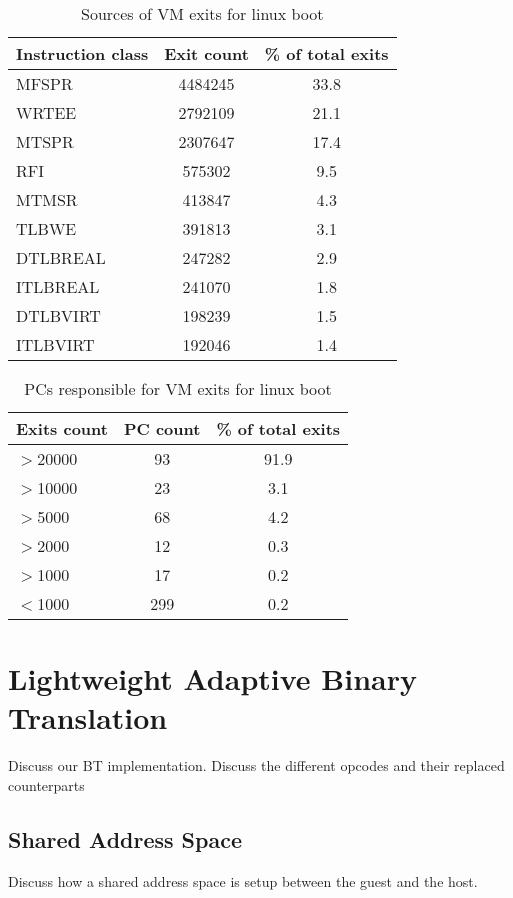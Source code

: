 \documentclass[10pt,twocolumn]{article}
\begin{document}
\begin{table}[!b]
\centering
\caption{Sources of VM exits for linux boot}
     \begin{tabular}{lcc} \hline
       Instruction class  & Exit count & \% of total exits  \\ \hline
       MFSPR & 4484245 & 33.8  \\
       WRTEE & 2792109 & 21.1  \\
       MTSPR & 2307647 & 17.4  \\
       RFI & 575302 & 9.5 \\
       MTMSR & 413847 & 4.3 \\
       TLBWE & 391813 & 3.1 \\
       DTLBREAL & 247282 & 2.9 \\
       ITLBREAL & 241070 & 1.8 \\
       DTLBVIRT & 198239 & 1.5 \\
       ITLBVIRT & 192046 & 1.4 \\
       \hline
     \end{tabular}
\label{tab:NumExitsBase}
\end{table}

\begin{table}[!b]
\centering
\caption{PCs responsible for VM exits for linux boot}
     \begin{tabular}{lcc} \hline
       Exits count  & PC count & \% of total exits  \\ \hline
       $>$20000 & 93 & 91.9  \\
       $>$10000 & 23 & 3.1  \\
       $>$5000 & 68 & 4.2  \\
       $>$2000 & 12 & 0.3 \\
       $>$1000 & 17 & 0.2 \\
       $<$1000 & 299 & 0.2 \\
       \hline
     \end{tabular}
\label{tab:NumPCBase}
\end{table}
\section{Lightweight Adaptive Binary Translation}
Discuss our BT implementation. Discuss the different opcodes and their replaced
counterparts
\subsection{Shared Address Space}
Discuss how a shared address space is setup between the guest and the host.
\end{document}
